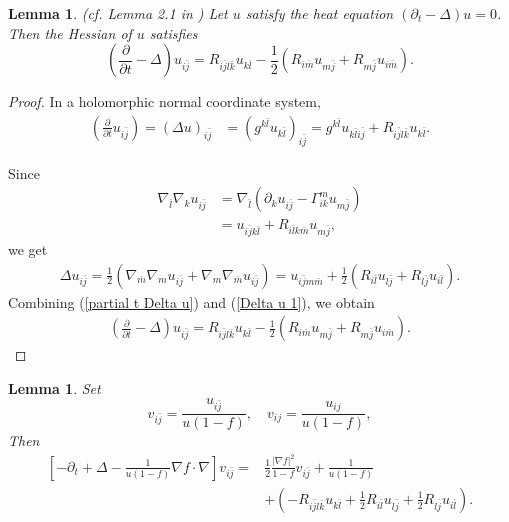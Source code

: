\documentclass{amsart}
\newtheorem{lemma}[theorem]{Lemma}
\theoremstyle{definition}
\theoremstyle{remark}
\numberwithin{equation}{section}
\begin{document}
\begin{lemma}\label{lemma:2.1}(cf. Lemma 2.1 in \cite{Cao-Ni})
    Let $u$ satisfy the heat equation $(\partial_t-\Delta) u=0$. Then the Hessian of $u$ satisfies
        \[
        \left(\frac{\partial}{\partial t}-\Delta\right) u_{i \bar{j}}=R_{i \bar{j} l \bar{k}} u_{k \bar{l}} - \frac{1}{2}
          \left(
            R_{i \bar{m}} u_{m {\bar{j}}} 
            + R_{m\bar{j}} u_{i \bar{m}}
          \right) .
        \]
\end{lemma}

\begin{proof}
    In a holomorphic normal coordinate system,
\begin{align}\label{partial t Delta u}
        \left(\frac{\partial}{\partial t} u_{i \bar{j}}\right)=(\Delta u)_{i \bar{j}}
          &=\left(g^{k \bar{l}} u_{k \bar{l}}\right)_{i \bar{j}}
          =g^{k \bar{l}} u_{k \bar{l} i \bar{j}}+R_{i \bar{j} l \bar{k}} u_{k \bar{l}}.
\end{align}

Since 
\begin{align*}
           \nabla_{\bar{l}} \nabla_k u_{i \bar{j}}&=\nabla_{\bar{l}}\left(\partial_k u_{i \bar{j}}-\Gamma_{i k}^m u_{m \bar{j}}\right) \nonumber\\
          & =u_{i \bar{j} k \bar{l}}+R_{i \bar{l} k \bar{m}} u_{m{\bar{j}}},
 \end{align*}
 we get
\begin{align}\label{Delta u 1}
        \Delta u_{i \bar{j}}=\frac{1}{2}\left(\nabla_{\bar{m}} \nabla_m u_{i \bar{j}}+\nabla_m \nabla_{\bar{m}} u_{i \bar{j}}\right) =u_{i \bar{j} m \bar{m}}+\frac{1}{2}\left(R_{i \bar{l}} u_{l\bar{j}}+R_{l\bar{j}} u_{i \bar{l}}\right).
\end{align}
Combining (\ref{partial t Delta u}) and (\ref{Delta u 1}), we obtain 
\begin{align*}
 \left(\frac{\partial}{\partial t}-\Delta\right) u_{i \bar{j}}=R_{i \bar{j} l \bar{k}} u_{k \bar{l}} - \frac{1}{2}
          \left(
            R_{i \bar{m}} u_{m {\bar{j}}} 
            + R_{m\bar{j}} u_{i \bar{m}}
          \right) .
\end{align*}
\end{proof}

\begin{lemma}\label{lemma:2.2}
Set
\[v_{i \bar{j}}=\frac{u_{i \bar{j}}}{u(1-f)}, \quad v_{i j}=\frac{u_{i j}}{u(1-f)},
\]
Then
\[
  \begin{aligned}
    \left[-\partial_t  + \Delta-\frac{1}{u(1-f)} \nabla f \cdot \nabla\right] v_{i \bar{j}} =&\frac{1}{2} \frac{|\nabla f|^2}{1-f} v_{i \bar{j}} +\frac{1}{u(1-f)} \\
    & +\left(-R_{i \bar{j} l \bar{k}} u_{k \bar{l}}+\frac{1}{2} R_{i \bar{l}} u_{l\bar{j}}+\frac{1}{2} R_{l \bar{j}} u_{i \bar{l}}\right).
  \end{aligned}
\]
\end{lemma}
\end{document}
